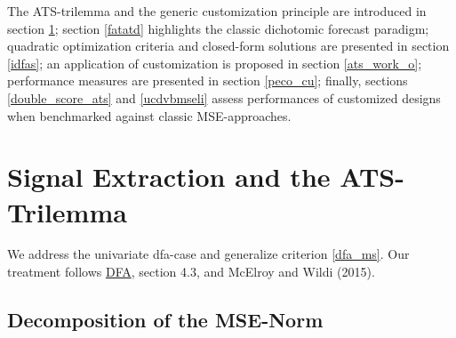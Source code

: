 \documentclass[a4paper]{book}
\begin{document}
The ATS-trilemma and the generic customization principle are introduced in section \ref{seatatst}; section \ref{fatatd} highlights the classic dichotomic forecast paradigm; quadratic optimization criteria and closed-form solutions are presented in section \ref{idfas}; an application of customization is proposed in section \ref{ats_work_o}; performance measures are presented in section \ref{peco_cu}; finally, sections \ref{double_score_ats} and \ref{ucdvbmseli} assess performances of customized designs when benchmarked against classic MSE-approaches. 











\section{Signal Extraction and the ATS-Trilemma}\label{seatatst}

We address the univariate dfa-case and generalize criterion \ref{dfa_ms}. Our treatment follows \href{http://blog.zhaw.ch/sef/files/2014/10/DFA.pdf}{DFA}, section 4.3, and McElroy and Wildi (2015). 


\subsection{Decomposition of the MSE-Norm}
\end{document}
